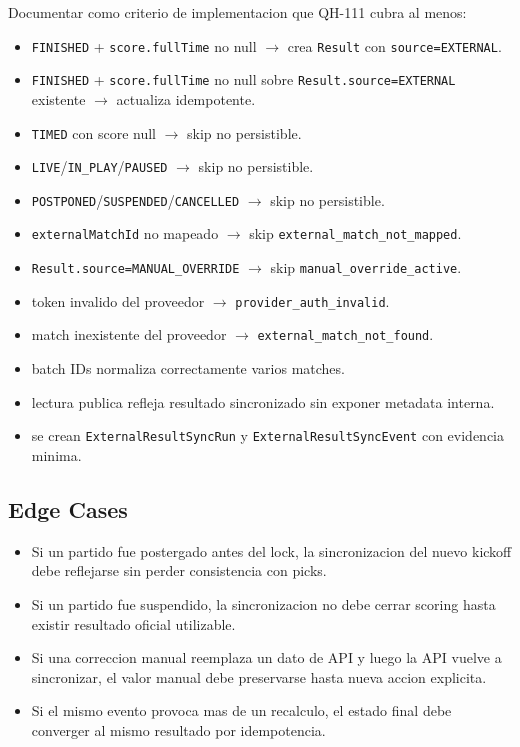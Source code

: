 Documentar como criterio de implementacion que QH-111 cubra al menos:
\begin{itemize}
  \item \texttt{FINISHED} + \texttt{score.fullTime} no null $\rightarrow$ crea \texttt{Result} con \texttt{source=EXTERNAL}.
  \item \texttt{FINISHED} + \texttt{score.fullTime} no null sobre \texttt{Result.source=EXTERNAL} existente $\rightarrow$ actualiza idempotente.
  \item \texttt{TIMED} con score null $\rightarrow$ skip no persistible.
  \item \texttt{LIVE}/\texttt{IN\_PLAY}/\texttt{PAUSED} $\rightarrow$ skip no persistible.
  \item \texttt{POSTPONED}/\texttt{SUSPENDED}/\texttt{CANCELLED} $\rightarrow$ skip no persistible.
  \item \texttt{externalMatchId} no mapeado $\rightarrow$ skip \texttt{external\_match\_not\_mapped}.
  \item \texttt{Result.source=MANUAL\_OVERRIDE} $\rightarrow$ skip \texttt{manual\_override\_active}.
  \item token invalido del proveedor $\rightarrow$ \texttt{provider\_auth\_invalid}.
  \item match inexistente del proveedor $\rightarrow$ \texttt{external\_match\_not\_found}.
  \item batch IDs normaliza correctamente varios matches.
  \item lectura publica refleja resultado sincronizado sin exponer metadata interna.
  \item se crean \texttt{ExternalResultSyncRun} y \texttt{ExternalResultSyncEvent} con evidencia minima.
\end{itemize}

\subsection{Edge Cases}

\begin{itemize}
  \item Si un partido fue postergado antes del lock, la sincronizacion del nuevo kickoff debe reflejarse sin perder consistencia con picks.
  \item Si un partido fue suspendido, la sincronizacion no debe cerrar scoring hasta existir resultado oficial utilizable.
  \item Si una correccion manual reemplaza un dato de API y luego la API vuelve a sincronizar, el valor manual debe preservarse hasta nueva accion explicita.
  \item Si el mismo evento provoca mas de un recalculo, el estado final debe converger al mismo resultado por idempotencia.
\end{itemize}


